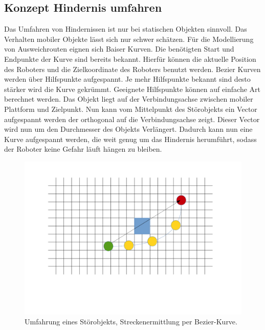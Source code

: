 \subsection{Konzept Hindernis umfahren}
Das Umfahren von Hindernissen ist nur bei statischen Objekten sinnvoll. Das Verhalten mobiler Objekte lässt sich nur schwer schätzen. Für die Modellierung von Ausweichrouten eignen sich Baiser Kurven. Die benötigten Start und Endpunkte der Kurve sind bereits bekannt. Hierfür können die aktuelle Position des Roboters und die Zielkoordinate des Roboters benutzt werden. Bezier Kurven werden über Hilfspunkte aufgespannt. Je mehr Hilfspunkte bekannt sind desto stärker wird die Kurve gekrümmt. Geeignete Hilfspunkte können auf einfache Art berechnet werden. Das Objekt liegt auf der Verbindungsachse zwischen mobiler Plattform und Zielpunkt. Nun kann vom Mittelpunkt des Störobjekts ein Vector aufgespannt werden der orthogonal auf die Verbindungsachse zeigt. Dieser Vector wird nun um den Durchmesser des Objekts Verlängert. Dadurch kann nun eine Kurve aufgespannt werden, die weit genug um das Hindernis herumführt, sodass der Roboter keine Gefahr läuft hängen zu bleiben.
\begin{figure}[H]
\centering
\includegraphics[width=0.9\linewidth]{../media/obj-curve}
\caption{Umfahrung eines Störobjekts, Streckenermittlung per Bezier-Kurve.}
\label{fig:obj-curve}
\end{figure}
